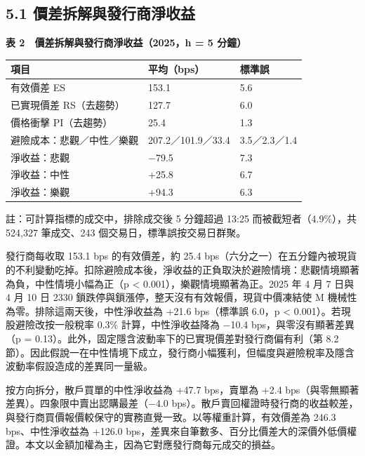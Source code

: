 \documentclass[12pt,a4paper]{article}
\begin{document}
\subsection*{5.1 價差拆解與發行商淨收益}

\begin{center}\textbf{表 2　價差拆解與發行商淨收益（2025，h = 5 分鐘）}\end{center}\vspace{-0.8em}

\begin{center}\small
\begin{tabularx}{\linewidth}{lYl}
\toprule
\textbf{項目} & \textbf{平均（bps）} & \textbf{標準誤} \\
\midrule
有效價差 ES & 153.1 & 5.6 \\
已實現價差 RS（去趨勢） & 127.7 & 6.0 \\
價格衝擊 PI（去趨勢） & 25.4 & 1.3 \\
避險成本：悲觀／中性／樂觀 & 207.2／101.9／33.4 & 3.5／2.3／1.4 \\
淨收益：悲觀 & −79.5 & 7.3 \\
淨收益：中性 & +25.8 & 6.7 \\
淨收益：樂觀 & +94.3 & 6.3 \\
\bottomrule
\end{tabularx}
\end{center}

{\small\noindent 註：可計算指標的成交中，排除成交後 5 分鐘超過 13:25 而被截短者（4.9\%），共 524,327 筆成交、243 個交易日，標準誤按交易日群聚。\par}

發行商每收取 153.1 bps 的有效價差，約 25.4 bps（六分之一）在五分鐘內被現貨的不利變動吃掉。扣除避險成本後，淨收益的正負取決於避險情境：悲觀情境顯著為負，中性情境小幅為正（p < 0.001），樂觀情境顯著為正。2025 年 4 月 7 日與 4 月 10 日 2330 鎖跌停與鎖漲停，整天沒有有效報價，現貨中價凍結使 M 機械性為零。排除這兩天後，中性淨收益為 +21.6 bps（標準誤 6.0，p < 0.001）。若現股避險改按一般稅率 0.3\% 計算，中性淨收益降為 −10.4 bps，與零沒有顯著差異（p = 0.13）。此外，固定隱含波動率下的已實現價差對發行商偏有利（第 8.2 節）。因此假說一在中性情境下成立，發行商小幅獲利，但幅度與避險稅率及隱含波動率假設造成的差異同一量級。

按方向拆分，散戶買單的中性淨收益為 +47.7 bps，賣單為 +2.4 bps（與零無顯著差異）。四象限中賣出認購最差（−4.0 bps）。散戶賣回權證時發行商的收益較差，與發行商買價報價較保守的實務直覺一致。以等權重計算，有效價差為 246.3 bps、中性淨收益為 +126.0 bps，差異來自筆數多、百分比價差大的深價外低價權證。本文以金額加權為主，因為它對應發行商每元成交的損益。
\end{document}
